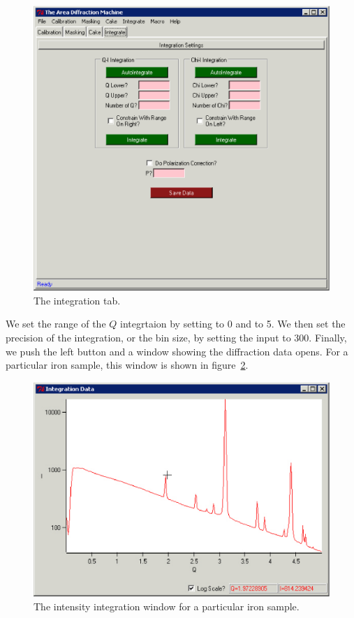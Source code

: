 \begin{figure}
    \centering
    \includegraphics[scale=.75]{figures/integration_page.eps}
    \caption{The integration tab.}
    \label{integration_page_example}
\end{figure}

We set the range of the $Q$ integrtaion by setting
 to 0 and  to 5. We
then set the precision of the integration, or the
bin size, by setting the  input
to 300. Finally, we push the left 
button and a window showing the diffraction data
opens. For a particular iron sample, this window
is shown in figure~\ref{iron_intensity}.

\begin{figure}
    \centering
    \includegraphics[scale=.75]{figures/iron_intensity.eps}
    \caption{The intensity integration window for 
    a particular iron sample.}
    \label{iron_intensity}
\end{figure}

